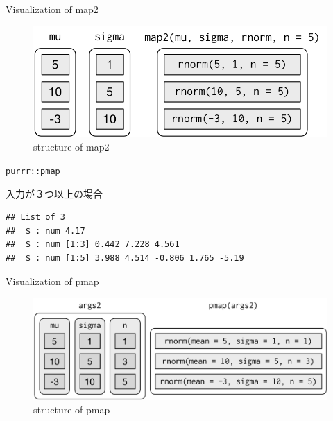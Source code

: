 \documentclass[ignorenonframetext,]{beamer}
\newenvironment{Shaded}{\begin{snugshade}}{\end{snugshade}}
\newcommand{\KeywordTok}[1]{\textcolor[rgb]{0.13,0.29,0.53}{\textbf{#1}}}
\newcommand{\DataTypeTok}[1]{\textcolor[rgb]{0.13,0.29,0.53}{#1}}
\newcommand{\DecValTok}[1]{\textcolor[rgb]{0.00,0.00,0.81}{#1}}
\newcommand{\StringTok}[1]{\textcolor[rgb]{0.31,0.60,0.02}{#1}}
\newcommand{\OperatorTok}[1]{\textcolor[rgb]{0.81,0.36,0.00}{\textbf{#1}}}
\newcommand{\NormalTok}[1]{#1}
\begin{document}
\begin{frame}{Visualization of map2}

\begin{figure}
\centering
\includegraphics{../img/lists-map2.png}
\caption{structure of map2}
\end{figure}

\end{frame}

\begin{frame}[fragile]{\texttt{purrr::pmap}}

入力が３つ以上の場合

\begin{Shaded}
\end{Shaded}

\begin{verbatim}
## List of 3
##  $ : num 4.17
##  $ : num [1:3] 0.442 7.228 4.561
##  $ : num [1:5] 3.988 4.514 -0.806 1.765 -5.19
\end{verbatim}

\end{frame}

\begin{frame}{Visualization of pmap}

\begin{figure}
\centering
\includegraphics{../img/lists-pmap-named.png}
\caption{structure of pmap}
\end{figure}

\end{frame}
\end{document}
